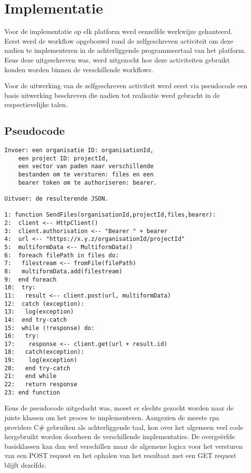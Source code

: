 \section{Implementatie}
Voor de implementatie op elk platform werd eenzelfde werkwijze gehanteerd. Eerst werd de \gls{workflow} opgebouwd rond de zelfgeschreven \gls{activiteit} om deze nadien te implementeren in de achterliggende programmeertaal van het platform. Eens deze uitgeschreven was, werd uitgezocht hoe deze \gls{activiteit}en gebruikt konden worden binnen de verschillende \gls{workflow}s.

Voor de uitwerking van de zelfgeschreven \gls{activiteit} werd eerst via pseudocode een basis uitwerking beschreven die nadien tot realisatie werd gebracht in de respectievelijke talen.

\subsection{Pseudocode}
\begin{lstlisting}
Invoer: een organisatie ID: organisationId, 
	een project ID: projectId,
	een vector van paden naar verschillende 
	bestanden om te versturen: files en een 
	bearer token om te authoriseren: bearer.
	
Uitvoer: de resulterende JSON.

1: function SendFiles(organisationId,projectId,files,bearer):
2:  client <-- HttpClient()
3:  client.authorisation <-- "Bearer " + bearer
4:  url <-- "https://x.y.z/organisationId/projectId"
5:  multiformData <-- MultiformData()
6:  foreach filePath in files do:
7:   filestream <-- fromFile(filePath)
8:   multiformData.add(filestream)
9:  end foreach
10:  try:
11:   result <-- client.post(url, multiformData)
12:  catch (exception):
13:   log(exception)
14:  end try-catch
15:  while (!response) do:
16:   try:
17:    response <-- client.get(url + result.id)
18:   catch(exception):
19:    log(exception)
20:   end try-catch
21:   end while
22:   return response
23: end function
\end{lstlisting}

Eens de pseudocode uitgedacht was, moest er slechts gezocht worden naar de juiste klassen om het proces te implementeren. Aangezien de meeste \acrshort{rpa} providers C\# gebruiken als achterliggende taal, kon over het algemeen veel code hergebruikt worden doorheen de verschillende implementaties. De overgeërfde basisklassen kan dan wel verschillen maar de algemene logica voor het versturen van een POST request en het ophalen van het resultaat met een GET request blijft dezelfde.

